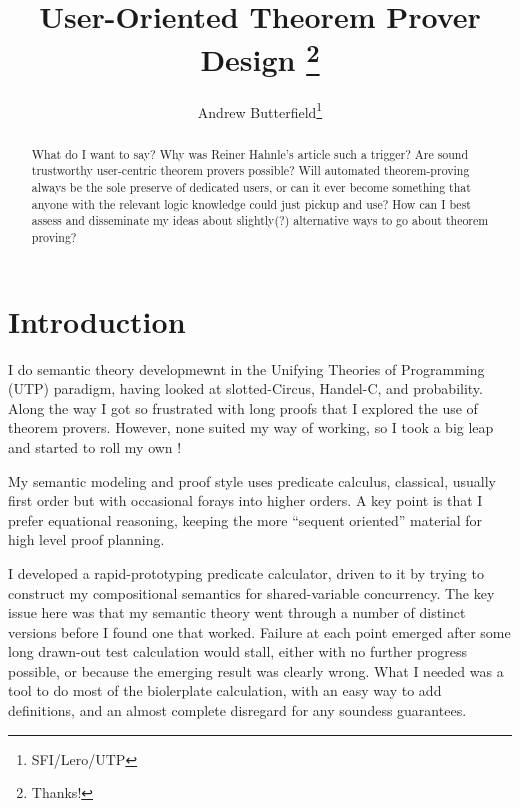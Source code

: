\documentclass[EPiC]{easychair}
\title{User-Oriented Theorem Prover Design%
\thanks{Thanks!}}
\author{
Andrew Butterfield\inst{1}\thanks{SFI/Lero/UTP}
}
\institute{
  Trinity College Dublin,
  Ireland\\
  \email{butrfeld@scss.tcd.ie}
 }
\begin{document}
\maketitle

\begin{abstract}
  What do I want to say?
  Why was Reiner Hahnle's article \cite{RH:UserExpr:2016}such a trigger?
  Are sound trustworthy user-centric theorem provers possible?
  Will automated theorem-proving always be the sole preserve of dedicated users,
  or can it ever become something that anyone with the relevant logic knowledge could just pickup and use?
  How can I best assess and disseminate my ideas about slightly(?) alternative ways
  to go about theorem proving?
\end{abstract}



\section{Introduction}
\label{sect:introduction}


I do semantic theory developmewnt in the
Unifying Theories of Programming (UTP) paradigm\cite{DBLP:conf/RelMiCS/1998},
having looked at slotted-Circus, Handel-C, and probability.
Along the way I got so frustrated with long proofs that
I explored the use of theorem provers.
However, none suited my way of working,
so I took a big leap and started to roll my own
\cite{conf/utp/Butterfield10,conf/utp/Butterfield12,DBLP:journals/corr/Butterfield14}!


My semantic modeling and proof style uses predicate calculus,
classical, usually first order
but with occasional forays into higher orders.
A key point is that I prefer equational reasoning,
keeping the more ``sequent oriented'' material for high level proof planning.

I developed a rapid-prototyping predicate calculator\cite{DBLP:conf/utp/Butterfield16},
driven to it by trying to construct
my compositional semantics for shared-variable concurrency.
The key issue here was that my semantic theory went through a number of
distinct versions before I found one that worked.
Failure at each point emerged after some long drawn-out test calculation
would stall, either with no further progress possible,
or because the emerging result was clearly wrong.
What I needed was a tool to do most of the biolerplate calculation,
with an easy way to add definitions, and an almost complete disregard
for any soundess guarantees.
\end{document}
